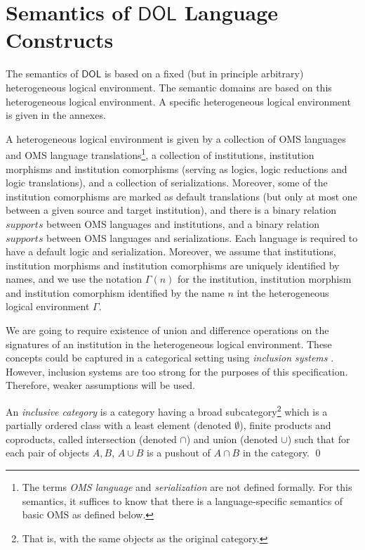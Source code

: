 \documentclass[10pt,fleqn,final]{scrreprt}
\newcommand*{\termref}[1]{\index{#1}#1\xspace}
\newcommand*{\DOL}{\ensuremath{\mathsf{DOL}}\xspace}
\newcommand{\sclause}[1]{\section{#1}}
\newenvironment{definitions}[0]{\medskip }{}
\begin{document}
\begin{definitions}
\sclause{Semantics of \DOL Language Constructs}\label{c:direct-sematics}

The semantics of \DOL is based on a fixed (but in principle arbitrary) heterogeneous logical 
environment.  The semantic domains are based on this heterogeneous logical environment. 
A specific heterogeneous logical environment is given in the annexes.

A heterogeneous logical environment is given by a collection of
OMS languages and OMS language translations\footnote{The
  terms \emph{OMS language} and \emph{serialization} are not
  defined formally. For this semantics, it suffices to know that there
  is a language-specific semantics of basic OMS as defined
  below.}, a collection of institutions, \termref{institution} morphisms and
institution comorphisms (serving as logics, logic reductions and logic
translations), and a collection of serializations. Moreover, some of the institution comorphisms are marked as default translations (but only at most one between a given source and target institution), and there is
a binary relation $\mathit{supports}$ between OMS languages and institutions,
and a binary relation $\mathit{supports}$ between OMS languages and
serializations. 
 Each language is required to have a default logic and serialization. Moreover, we assume
 that institutions, institution morphisms and institution comorphisms
 are uniquely identified by names, and we use
 the notation $\Gamma(n)$ for the institution, institution morphism and institution comorphism identified by the name $n$ int the heterogeneous logical environment $\Gamma$.

We are going to require existence of union and difference operations on the signatures
of an institution in the heterogeneous logical environment.
These concepts could be captured in a categorical setting using \emph{inclusion systems} \cite{DGS91}.
 However, inclusion systems are too strong for the purposes of this specification.  Therefore, weaker assumptions will be used.

\begin{definition}  
 An \emph{inclusive category} \cite{DBLP:conf/birthday/GoguenR04} 
 is a category having a broad subcategory\footnote{That is, with the same objects as the original category.}
which is a partially ordered class with 
a least element (denoted $\emptyset$),
finite products and coproducts, called intersection (denoted $\cap$) and union
(denoted $\cup$) such that for each pair of objects $A, B$, $A \cup B$ is a pushout of $A \cap B$ in the category.
\qed \end{definition}


\end{definitions}
\end{document}
